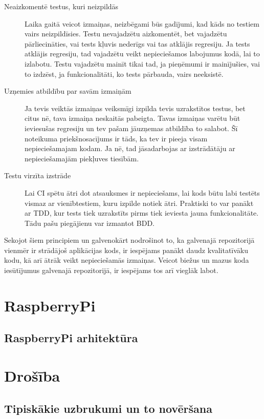 \begin{description}
	\item [Neaizkomentē testus, kuri neizpildās] Laika gaitā veicot izmaiņas, neizbēgami būs gadījumi, kad kāds no testiem vairs neizpildīsies. Testu nevajadzētu aizkomentēt, bet vajadzētu pārliecināties, vai tests kļuvis nederīgs vai tas atklājis regresiju. Ja tests atklājis regresiju, tad vajadzētu veikt nepieciešamos labojumus kodā, lai to izlabotu. Testu vajadzētu mainīt tikai tad, ja pieņēmumi ir mainījušies, vai to izdzēst, ja funkcionalitāti, ko tests pārbauda, vairs neeksistē.
	\item [Uzņemies atbildību par savām izmaiņām] Ja tevis veiktās izmaiņas veiksmīgi izpilda tevis uzrakstītos testus, bet citus nē, tava izmaiņa neskaitās pabeigta. Tavas izmaiņas varētu būt ieviesušas regresiju un tev pašam jāuzņemas atbildība to salabot. Šī noteikuma priekšnosacījums ir tāds, ka tev ir pieeja visam nepieciešamajam kodam. Ja nē, tad jāsadarbojas ar izstrādātāju ar nepieciešamajām piekļuves tiesībām.
	\item [Testu virzīta izstrāde] Lai CI spētu ātri dot atsauksmes ir nepieciešams, lai kods būtu labi testēts vismaz ar vienībtestiem, kuru izpilde notiek ātri. Praktiski to var panākt ar TDD, kur tests tiek uzrakstīts pirms tiek ieviesta jauna funkcionalitāte. Tādu pašu piegājienu var izmantot BDD.
\end{description}
Sekojot šiem principiem un galvenokārt nodrošinot to, ka galvenajā repozitorijā vienmēr ir strādājoš aplikācijas kods, ir iespējams panākt daudz kvalitatīvāku kodu, kā arī ātrāk veikt nepieciešamās izmaiņas. Veicot biežus un mazus koda iesūtījumus galvenajā repozitorijā, ir iespējams tos arī vieglāk labot.


\chapter{RaspberryPi}
\section{RaspberryPi arhitektūra}

\chapter{Drošība}

\section{Tipiskākie uzbrukumi un to novēršana}

